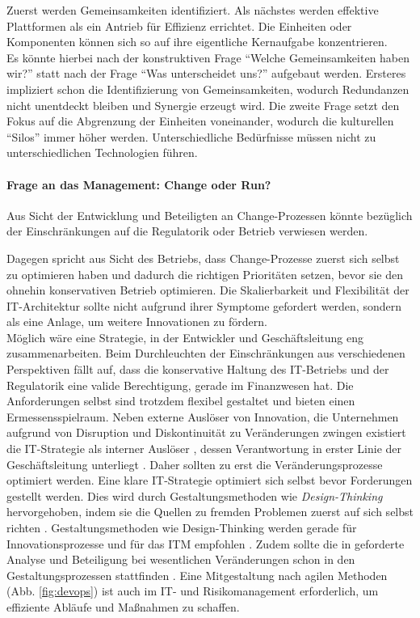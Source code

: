 Zuerst werden Gemeinsamkeiten identifiziert. Als nächstes werden effektive Plattformen als ein Antrieb für Effizienz errichtet. Die Einheiten oder Komponenten können sich so auf ihre eigentliche Kernaufgabe konzentrieren. 
\medskip
\\
Es könnte hierbei nach der konstruktiven Frage \enquote{Welche Gemeinsamkeiten haben wir?} statt nach der Frage \enquote{Was unterscheidet uns?} aufgebaut werden. Ersteres impliziert schon die Identifizierung von Gemeinsamkeiten, wodurch Redundanzen nicht unentdeckt bleiben und Synergie erzeugt wird. Die zweite Frage setzt den Fokus auf die Abgrenzung der Einheiten voneinander, wodurch die kulturellen \enquote{Silos} immer höher werden. Unterschiedliche Bedürfnisse müssen nicht zu unterschiedlichen Technologien führen. 

\paragraph{Frage an das Management: Change oder Run?}
Aus Sicht der Entwicklung und Beteiligten an Change-Prozessen könnte bezüglich der Einschränkungen auf die Regulatorik oder Betrieb verwiesen werden.

Dagegen spricht aus Sicht des Betriebs, dass Change-Prozesse zuerst sich selbst zu optimieren haben und dadurch die richtigen Prioritäten setzen, bevor sie den ohnehin konservativen Betrieb optimieren. Die Skalierbarkeit und Flexibilität der IT-Architektur sollte nicht aufgrund ihrer Symptome gefordert werden, sondern als eine Anlage, um weitere Innovationen zu fördern.
\medskip
\\
Möglich wäre eine Strategie, in der Entwickler und Geschäftsleitung eng zusammenarbeiten.
Beim Durchleuchten der Einschränkungen aus verschiedenen Perspektiven fällt auf, dass die konservative Haltung des IT-Betriebs und der Regulatorik eine valide Berechtigung, gerade im Finanzwesen hat. Die Anforderungen selbst sind trotzdem flexibel gestaltet und bieten einen Ermessensspielraum. 
Neben externe Auslöser von Innovation, die Unternehmen aufgrund von Disruption und Diskontinuität zu Veränderungen zwingen \cite{Gupta:2017, Fernandez:2020} existiert die IT-Strategie als interner Auslöser \cite{BAIT:2018, Alt2017}, dessen Verantwortung in erster Linie der Geschäftsleitung unterliegt \cite{BAIT:2018}. Daher sollten zu erst die Veränderungsprozesse optimiert werden. Eine klare IT-Strategie optimiert sich selbst bevor Forderungen gestellt werden. Dies wird durch Gestaltungsmethoden wie \emph{Design-Thinking} hervorgehoben, indem sie die Quellen zu fremden Problemen zuerst auf sich selbst richten \cite{yüksel:digit}. Gestaltungsmethoden wie Design-Thinking werden gerade für Innovationsprozesse und für das \ac{ITM} empfohlen \cite{Alt2017, Koch2016}. Zudem sollte die in \citet[AT 8.2]{MaRisk:2017} geforderte Analyse und Beteiligung bei wesentlichen Veränderungen schon in den Gestaltungsprozessen stattfinden \cite{Dorschel2018}. Eine Mitgestaltung nach agilen Methoden (Abb. \ref{fig:devops}) ist auch im IT- und Risikomanagement erforderlich, um effiziente Abläufe und Maßnahmen zu schaffen.


